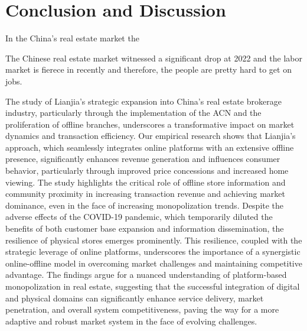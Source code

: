 \documentclass[11pt]{article}
\begin{document}
\section{Conclusion and Discussion} \label{sec:conclusion}

In the China's real estate market the 

The Chinese real estate market witnessed a significant drop at 2022 and the labor market is fierece in recently and therefore, the people are pretty hard to get on jobs.

The study of Lianjia's strategic expansion into China's real estate brokerage industry, particularly through the implementation of the ACN and the proliferation of offline branches, underscores a transformative impact on market dynamics and transaction efficiency. Our empirical research shows that Lianjia's approach, which seamlessly integrates online platforms with an extensive offline presence, significantly enhances revenue generation and influences consumer behavior, particularly through improved price concessions and increased home viewing. The study highlights the critical role of offline store information and community proximity in increasing transaction revenue and achieving market dominance, even in the face of increasing monopolization trends. Despite the adverse effects of the COVID-19 pandemic, which temporarily diluted the benefits of both customer base expansion and information dissemination, the resilience of physical stores emerges prominently. This resilience, coupled with the strategic leverage of online platforms, underscores the importance of a synergistic online-offline model in overcoming market challenges and maintaining competitive advantage. The findings argue for a nuanced understanding of platform-based monopolization in real estate, suggesting that the successful integration of digital and physical domains can significantly enhance service delivery, market penetration, and overall system competitiveness, paving the way for a more adaptive and robust market system in the face of evolving challenges.
\end{document}
